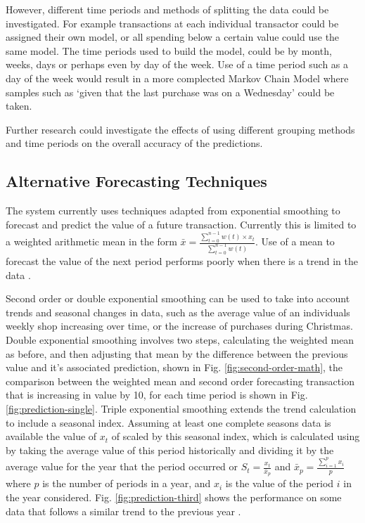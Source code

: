 However, different time periods and methods of splitting the data could be investigated. For example transactions at each individual transactor could be assigned their own model, or all spending below a certain value could use the same model. The time periods used to build the model, could be by month, weeks, days or perhaps even by day of the week. Use of a time period such as a day of the week would result in a more complected Markov Chain Model where samples such as `given that the last purchase was on a Wednesday' could be taken.

Further research could investigate the effects of using different grouping methods and time periods on the overall accuracy of the predictions.

\subsection{Alternative Forecasting Techniques}
\label{section:triplesmoothing}
The system currently uses techniques adapted from exponential smoothing to forecast and predict the value of a future transaction. Currently this is limited to a weighted arithmetic mean in the form $\bar{x} = \frac{\sum^{n-1}_{t=0}{w(t) \times x_{t}}}{\sum_{t=0}^{n-1}{w(t)}}$. Use of a mean to forecast the value of the next period performs poorly when there is a trend in the data \parencite{filliben2003nist}.

Second order or double exponential smoothing can be used to take into account trends and seasonal changes in data, such as the average value of an individuals weekly shop increasing over time, or the increase of purchases during Christmas. 
%
Double exponential smoothing involves two steps, calculating the weighted mean as before, and then adjusting that mean by the difference between the previous value and it's associated prediction, shown in Fig. \ref{fig:second-order-math}, the comparison between the weighted mean and second order forecasting transaction that is increasing in value by 10, for each time period is shown in Fig. \ref{fig:prediction-single}. 
%
Triple exponential smoothing extends the trend calculation to include a seasonal index. Assuming at least one complete seasons data is available the value of $x_t$ of scaled by this seasonal index, which is calculated using by taking the average value of this period historically and dividing it by the average value for the year that the period occurred or $S_{t} = \frac{x_t}{\bar{x}_p}$ and $\bar{x}_p = \frac{\sum_{i=1}^{p} x_i}{p}$ where $p$ is the number of periods in a year, and $x_i$ is the value of the period $i$ in the year considered. Fig. \ref{fig:prediction-third} shows the performance on some data that follows a similar trend to the previous year \parencite{kalekar2004holtwinters,dash2012movingaverages}.

